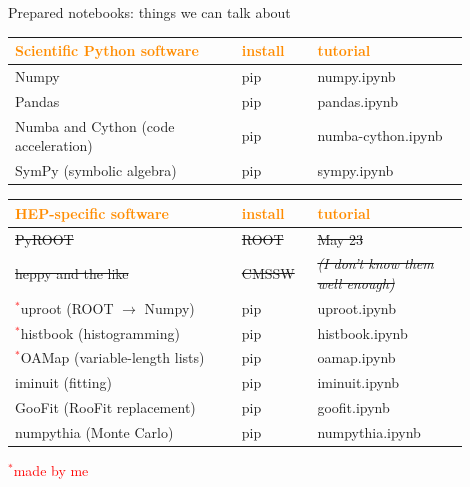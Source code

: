 \documentclass[aspectratio=169]{beamer}
\begin{document}
\begin{frame}{Prepared notebooks: things we can talk about}
\vspace{0.3 cm}
\renewcommand{\arraystretch}{1.1}

\begin{tabular}{p{0.45\linewidth} >{\centering\arraybackslash}p{0.15\linewidth} p{0.3\linewidth}}
\textcolor{darkorange}{\bf Scientific Python software} & \textcolor{darkorange}{\bf install} & \textcolor{darkorange}{\bf tutorial} \\\hline
Numpy & pip & numpy.ipynb \\
Pandas & pip & pandas.ipynb \\
Numba and Cython (code acceleration) & pip & numba-cython.ipynb \\
SymPy (symbolic algebra) & pip & sympy.ipynb \\
\end{tabular}

\vspace{0.25 cm}

\begin{tabular}{p{0.45\linewidth} >{\centering\arraybackslash}p{0.15\linewidth} p{0.3\linewidth}}
\textcolor{darkorange}{\bf HEP-specific software} & \textcolor{darkorange}{\bf install} & \textcolor{darkorange}{\bf tutorial} \\\hline
\sout{PyROOT} & \sout{ROOT} & \sout{May 23} \\
\sout{heppy and the like} & \sout{CMSSW} & {\it\scriptsize\sout{(I don't know them well enough)}} \\
\textcolor{red}{$^*$}uproot (ROOT $\to$ Numpy) & pip & uproot.ipynb \\
\textcolor{red}{$^*$}histbook (histogramming) & pip & histbook.ipynb \\
\textcolor{red}{$^*$}OAMap (variable-length lists) & pip & oamap.ipynb \\
iminuit (fitting) & pip & iminuit.ipynb \\
GooFit (RooFit replacement) & pip & goofit.ipynb \\
numpythia (Monte Carlo) & pip & numpythia.ipynb \\
\end{tabular}

\vspace{-3 cm}
\hfill \tiny\textcolor{red}{$^*$made by me\hspace{-0.5 cm}}
\vspace{3 cm}
\end{frame}
\end{document}
